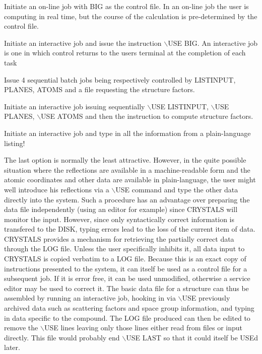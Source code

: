 \documentclass[10pt,a4paper]{report}
\begin{document}
\bigskip{}




Initiate an on-line job with BIG as the control file. In an on-line
 job the user is computing in real time, but the course of the calculation
 is pre-determined by the control file.


\bigskip{}




Initiate an interactive job and issue the instruction $\backslash$USE BIG.
 An interactive job is one in which control returns to the
 users terminal at the completion of each task


\bigskip{}




Issue 4 sequential batch jobs being respectively controlled by
 LISTINPUT, PLANES, ATOMS and a file requesting the structure factors.


\bigskip{}




Initiate an interactive job issuing sequentially $\backslash$USE LISTINPUT,
 $\backslash$USE PLANES, $\backslash$USE ATOMS and then the instruction to compute structure factors.


\bigskip{}




Initiate an interactive job and type in all the information from a
 plain-language listing!


 


The last option is normally the least attractive. However, in the quite
 possible situation where the reflections are available in a machine-readable
 form and the atomic coordinates and other data are available in
 plain-language, the user might well introduce his reflections via a
 $\backslash$USE command and type the other data directly into the system.
 Such a procedure has an advantage
 over preparing the data file independently (using an editor for example) since
 CRYSTALS will monitor the input. However, since only syntactically correct
 information is transfered to the DISK, typing errors lead to the loss
 of the current item of data. CRYSTALS provides a mechanism  for retrieving
 the partially correct data through the LOG file. Unless the user specifically
 inhibits it, all data input to CRYSTALS is copied verbatim to a LOG file.
 Because this is an exact copy of instructions presented to the system, it
 can itself be used as a control file for a subsequent job. If it is error 
 free, it can be used unmodified, otherwise a service editor may be used to
 correct it. The basic data file for a structure can thus be assembled
 by running an interactive job, hooking in via $\backslash$USE previously archived
 data such as scattering factors and space group information, and typing
 in data specific to the compound. The LOG file produced can then be edited
 to remove the $\backslash$USE lines leaving only those lines either read from files
 or input directly. This file would probably end $\backslash$USE LAST so that it could
 itself be USEd later. 
\end{document}
